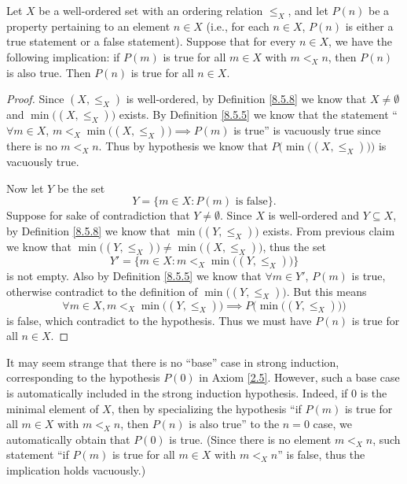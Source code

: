 \begin{proposition}\label{8.5.10}
    Let \(X\) be a well-ordered set with an ordering relation \(\leq_X\), and let \(P(n)\) be a property pertaining to an element \(n \in X\)
    (i.e., for each \(n \in X\), \(P(n)\) is either a true statement or a false statement).
    Suppose that for every \(n \in X\), we have the following implication:
    if \(P(m)\) is true for all \(m \in X\) with \(m <_X n\), then \(P(n)\) is also true.
    Then \(P(n)\) is true for all \(n \in X\).
\end{proposition}

\begin{proof}
    Since \((X, \leq_X)\) is well-ordered, by Definition \ref{8.5.8} we know that \(X \neq \emptyset\) and \(\min\big((X, \leq_X)\big)\) exists.
    By Definition \ref{8.5.5} we know that the statement ``\(\forall m \in X\), \(m <_X \min\big((X, \leq_X)\big) \implies P(m)\) is true'' is vacuously true since there is no \(m <_X n\).
    Thus by hypothesis we know that \(P\Big(\min\big((X, \leq_X)\big)\Big)\) is vacuously true.

    Now let \(Y\) be the set
    \[
        Y = \{m \in X : P(m) \text{ is false}\}.
    \]
    Suppose for sake of contradiction that \(Y \neq \emptyset\).
    Since \(X\) is well-ordered and \(Y \subseteq X\), by Definition \ref{8.5.8} we know that \(\min\big((Y, \leq_X)\big)\) exists.
    From previous claim we know that \(\min\big((Y, \leq_X)\big) \neq \min\big((X, \leq_X)\big)\), thus the set
    \[
        Y' = \{m \in X : m <_X \min\big((Y, \leq_X)\big)\}
    \]
    is not empty.
    Also by Definition \ref{8.5.5} we know that \(\forall m \in Y'\), \(P(m)\) is true, otherwise contradict to the definition of \(\min\big((Y, \leq_X)\big)\).
    But this means
    \[
        \forall m \in X, m <_X \min\big((Y, \leq_X)\big) \implies P\Big(\min\big((Y, \leq_X)\big)\Big)
    \]
    is false, which contradict to the hypothesis.
    Thus we must have \(P(n)\) is true for all \(n \in X\).
\end{proof}

\begin{remark}\label{8.5.11}
    It may seem strange that there is no ``base'' case in strong induction, corresponding to the hypothesis \(P(0)\) in Axiom \ref{2.5}.
    However, such a base case is automatically included in the strong induction hypothesis.
    Indeed, if \(0\) is the minimal element of \(X\), then by specializing the hypothesis ``if \(P(m)\) is true for all \(m \in X\) with \(m <_X n\), then \(P(n)\) is also true'' to the \(n = 0\) case, we automatically obtain that \(P(0)\) is true.
    (Since there is no element \(m <_X n\), such statement ``if \(P(m)\) is true for all \(m \in X\) with \(m <_X n\)'' is false, thus the implication holds vacuously.)
\end{remark}

